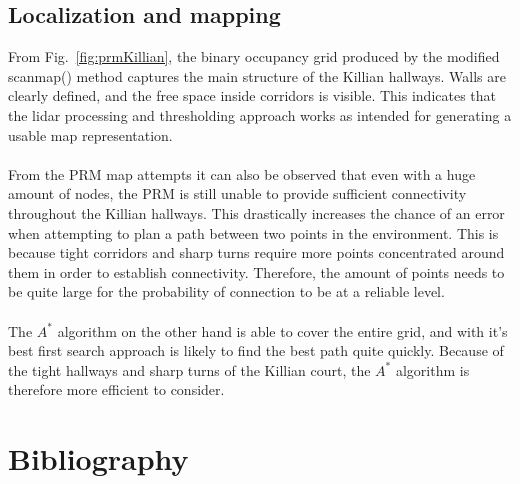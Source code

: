 \documentclass[a4paper,12pt]{article}
\begin{document}
\subsection{Localization and mapping}
From Fig.~\ref{fig:prmKillian}, the binary occupancy grid produced by the
modified scanmap() method captures the main structure of the Killian hallways.
Walls are clearly defined, and the free space inside corridors is visible.
This indicates that the lidar processing and thresholding approach works
as intended for generating a usable map representation.
\\\\
From the PRM map attempts it can also be observed that even with a huge amount
of nodes, the PRM is still unable to provide sufficient connectivity throughout 
the Killian hallways. This drastically increases the chance of an error when attempting to 
plan a path between two points in the environment. This is because tight corridors and
sharp turns require more points concentrated around them in order to establish connectivity.
Therefore, the amount of points needs to be quite large for the probability of connection to be
at a reliable level. 
\\\\
The $A^*$ algorithm on the other hand is able to cover the entire grid, and with it's
best first search approach is likely to find the best path quite quickly. Because of the tight
hallways and sharp turns of the Killian court, the $A^*$ algorithm is therefore more efficient
to consider.


\section{Bibliography}
\printbibliography
\end{document}

